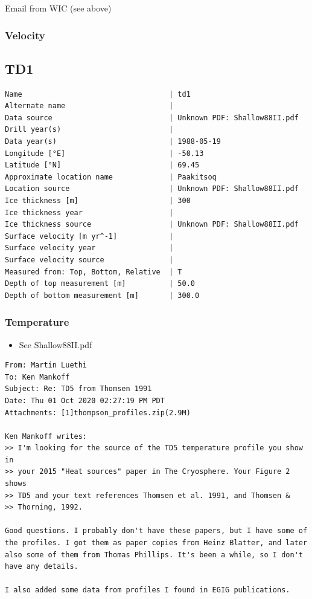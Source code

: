 \documentclass[article,a4paper,times,11pt,twoside]{article}
\begin{document}
Email from WIC (see above)

\subsubsection{Velocity}
\label{sec:org2ebd1e1}
\clearpage
\subsection{TD1}
\label{sec:org37ae398}
\begin{verbatim}
Name                                  | td1
Alternate name                        | 
Data source                           | Unknown PDF: Shallow88II.pdf
Drill year(s)                         | 
Data year(s)                          | 1988-05-19
Longitude [°E]                        | -50.13
Latitude [°N]                         | 69.45
Approximate location name             | Paakitsoq
Location source                       | Unknown PDF: Shallow88II.pdf
Ice thickness [m]                     | 300
Ice thickness year                    | 
Ice thickness source                  | Unknown PDF: Shallow88II.pdf
Surface velocity [m yr^-1]            | 
Surface velocity year                 | 
Surface velocity source               | 
Measured from: Top, Bottom, Relative  | T
Depth of top measurement [m]          | 50.0
Depth of bottom measurement [m]       | 300.0
\end{verbatim}

\subsubsection{Temperature}
\label{sec:org2a75bf5}

\begin{itemize}
\item See Shallow88II.pdf
\end{itemize}

\begin{verbatim}
From: Martin Luethi
To: Ken Mankoff
Subject: Re: TD5 from Thomsen 1991
Date: Thu 01 Oct 2020 02:27:19 PM PDT
Attachments: [1]thompson_profiles.zip(2.9M)

Ken Mankoff writes:
>> I'm looking for the source of the TD5 temperature profile you show in
>> your 2015 "Heat sources" paper in The Cryosphere. Your Figure 2 shows
>> TD5 and your text references Thomsen et al. 1991, and Thomsen &
>> Thorning, 1992.

Good questions. I probably don't have these papers, but I have some of
the profiles. I got them as paper copies from Heinz Blatter, and later
also some of them from Thomas Phillips. It's been a while, so I don't
have any details.

I also added some data from profiles I found in EGIG publications. 
\end{verbatim}
\end{document}
